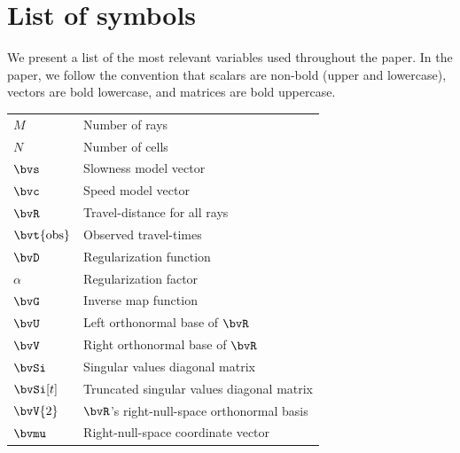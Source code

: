 \section*{List of symbols}
\label{app:appA:list_of_symbols}
We present a list of the most relevant variables used throughout the paper. In the paper, we follow the convention that scalars are non-bold (upper and lowercase), vectors are bold lowercase, and matrices are bold uppercase.

\noindent\begin{tabular}{l l}
	$M$ & Number of rays \\
	$N$ & Number of cells \\
	$\bvs$ & Slowness model vector \\
	$\bvc$ & Speed model vector \\
	$\bvR$ & Travel-distance for all rays \\
	$\bvt{\obs}$ & Observed travel-times \\
	$\bvD$ & Regularization function \\
	$\alpha$ & Regularization factor \\
	$\bvG$ & Inverse map function \\
	$\bvU$ & Left orthonormal base of $\bvR$ \\
	$\bvV$ & Right orthonormal base of $\bvR$ \\
	$\bvSi$ & Singular values diagonal matrix \\
	$\bvSi[t]$ & Truncated singular values diagonal matrix \\
	$\bvV{2}$ & $\bvR$'s right-null-space orthonormal basis \\
	$\bvmu$ & Right-null-space coordinate vector
\end{tabular}